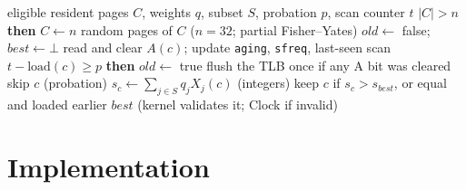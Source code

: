 \documentclass{article}
\newcommand{\figdata}{figures/data}
\newcommand{\clock}{Clock\xspace}
\newcommand{\feat}[1]{\texttt{#1}}
\begin{document}
\begin{table}[t]
\caption{What each sample size costs and saves. Left: instructions the kernel needs to choose one page to evict when 68, 516 or 824 pages are in memory. Right: faults relative to scoring every page (simulator, validation streams) at each memory size. 32 is the smallest sample within 1\% of scoring every page at all three sizes.}
\label{tab:samples}
\vskip 0.05in
\begin{center}
\begin{footnotesize}
\setlength{\tabcolsep}{3pt}
\resizebox{\linewidth}{!}{}
\end{footnotesize}
\end{center}
\vskip -0.1in
\end{table}

\begin{algorithm}[t]
\caption{Choosing a page with the learned score (\texttt{choose\_ml}), one eviction}
\label{alg:choose}
\begin{algorithmic}
 eligible resident pages $C$, weights $q$, subset $S$, probation $p$, scan counter $t$
 $|C| > n$ {\bfseries then} $C \leftarrow n$ random pages of $C$ \hfill ($n=32$; partial Fisher--Yates)
\STATE $old \leftarrow$ false; \ $best \leftarrow \bot$
  \STATE read and clear $A(c)$; update \feat{aging}, \feat{sfreq}, last-seen scan
   $t - \mathrm{load}(c) \ge p$ {\bfseries then} $old \leftarrow$ true
\ENDFOR
\STATE flush the TLB once if any A bit was cleared
    \STATE skip $c$ \hfill (probation)
  \ENDIF
  \STATE $s_c \leftarrow \sum_{j\in S} q_j X_j(c)$ \hfill (integers)
  \STATE keep $c$ if $s_c > s_{best}$, or equal and loaded earlier
\ENDFOR
{} $best$ \hfill (kernel validates it; \clock if invalid)
\end{algorithmic}
\end{algorithm}

\section{Implementation}
\label{sec:impl}
\end{document}
